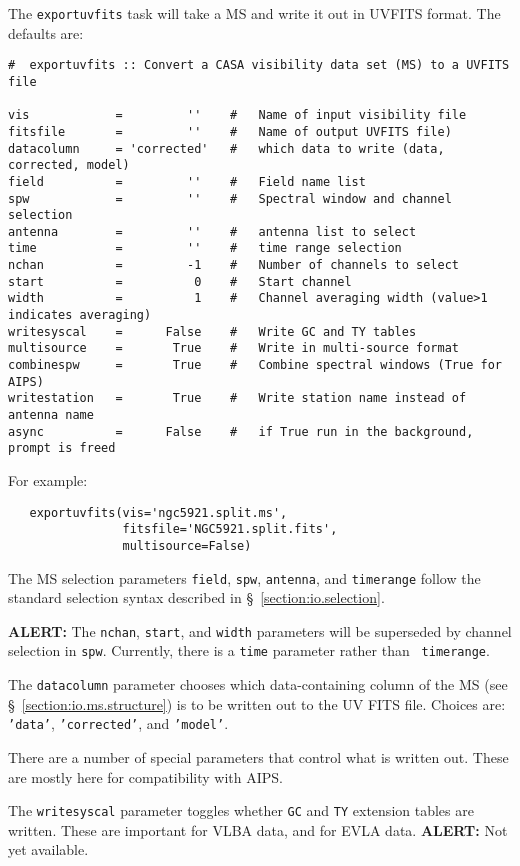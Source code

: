 The {\tt exportuvfits} task will take a MS and write it out in UVFITS
format.  The defaults are:
\small
\begin{verbatim}
#  exportuvfits :: Convert a CASA visibility data set (MS) to a UVFITS file

vis            =         ''    #   Name of input visibility file
fitsfile       =         ''    #   Name of output UVFITS file)
datacolumn     = 'corrected'   #   which data to write (data, corrected, model)
field          =         ''    #   Field name list
spw            =         ''    #   Spectral window and channel selection
antenna        =         ''    #   antenna list to select
time           =         ''    #   time range selection
nchan          =         -1    #   Number of channels to select
start          =          0    #   Start channel
width          =          1    #   Channel averaging width (value>1 indicates averaging)
writesyscal    =      False    #   Write GC and TY tables
multisource    =       True    #   Write in multi-source format
combinespw     =       True    #   Combine spectral windows (True for AIPS)
writestation   =       True    #   Write station name instead of antenna name
async          =      False    #   if True run in the background, prompt is freed
\end{verbatim}
\normalsize

For example:
\small
\begin{verbatim}
   exportuvfits(vis='ngc5921.split.ms',
                fitsfile='NGC5921.split.fits',
                multisource=False)
\end{verbatim}
\normalsize

The MS selection parameters {\tt field}, {\tt spw}, {\tt antenna}, 
and {\tt timerange} follow the standard selection syntax described
in \S~\ref{section:io.selection}.

{\bf ALERT:} The {\tt nchan}, {\tt start}, and {\tt width}
parameters will be superseded by channel selection in {\tt spw}.
Currently, there is a {\tt time} parameter rather than {\tt
  timerange}.

The {\tt datacolumn} parameter chooses which data-containing column
of the MS (see \S~\ref{section:io.ms.structure}) is to be written out
to the UV FITS file.  Choices are: {\tt 'data'}, {\tt 'corrected'}, 
and {\tt 'model'}.

There are a number of special parameters that control what is written
out.  These are mostly here for compatibility with AIPS. 

The {\tt writesyscal} parameter toggles whether {\tt GC} and 
{\tt TY} extension tables are written.  These are important for
VLBA data, and for EVLA data.  {\bf ALERT:} Not yet available.

